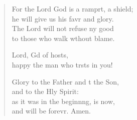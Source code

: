 \begin{verse}
\begin{patverse}
For the Lord God is a ramprt, a shield;\Med\\
he will give us his favr and glory.\\
The Lord will not refuse ny good\Med\\
to those who walk w\pointup{\i}thout blame.

Lord, Gd of hosts,\Med\\
happy the man who trsts in you!

Glory to the Father and t the Son,\Med\\
and to the Hly Spirit:\\
as it was in the beginn\pointup{\i}ng, is now,\Med\\
and will be forevr. Amen. 
  \end{patverse}
\end{verse}
